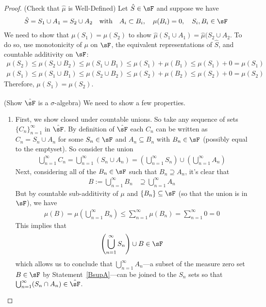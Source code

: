 \documentclass[12pt]{article}
\theoremstyle{plain}
\theoremstyle{definition}
\theoremstyle{remark}
\newcommand{\ninf}{_{n=1}^\infty}
\begin{document}
\begin{proof}
(Check that $\hat{\mu}$ is Well-Defined) Let $\hat{S}\in\sF$ and
suppose we have
\begin{align*}
    \hat{S} = S_1 \cup A_1 = S_2 \cup A_2
    \quad\text{with}\quad
    A_i \subset B_i, \quad \mu(B_i) = 0,
    \quad S_i, B_i \in \sF
\end{align*}
We need to show that $\mu(S_1) = \mu(S_2)$ to show $\hat{\mu}(S_1\cup
A_1) = \hat{\mu}(S_2\cup A_2$. To do so, use monotonicity of $\mu$ on
$\sF$, the equivalent representations of $\hat{S}$, and
countable additivity on $\sF$:
\begin{align*}
  \mu(S_2) \leq \mu(S_2 \cup B_2) \leq
      \mu(S_1 \cup B_1) \leq \mu(S_1) + \mu(B_1)
      \leq \mu(S_1) + 0 = \mu(S_1)  \\
  \mu(S_1) \leq \mu(S_1 \cup B_1) \leq
      \mu(S_2 \cup B_2) \leq \mu(S_2) + \mu(B_2)
      \leq \mu(S_2) + 0 = \mu(S_2)
\end{align*}
Therefore, $\mu(S_1) = \mu(S_2)$.
\\
\\
(Show $\hat{\sF}$ is a $\sigma$-algebra) We need to show a few properties.
\begin{enumerate}
  \item
    First, we show closed under countable unions. So take any sequence
    of sets $\{C_n\}\ninf$ in $\hat{\sF}$. By definition of
    $\hat{\sF}$ each $C_n$ can be written as $C_n=S_n\cup A_n$ for some
    $S_n \in \sF$ and $A_n\subseteq B_n$ with $B_n\in\sF$ (possibly
    equal to the emptyset). So consider the union
    \begin{align*}
        \bigcup^\infty_{n=1} C_n=
        \bigcup^\infty_{n=1} (S_n\cup A_n) =
        \left(\bigcup^\infty_{n=1} S_n\right)
        \cup \left(\bigcup^\infty_{n=1} A_n\right)
    \end{align*}
    Next, considering all of the $B_n\in\sF$ such that $B_n\supseteq
    A_n$, it's clear that
    \begin{align}
        B:=\bigcup^\infty_{n=1} B_n &\supseteq
        \bigcup^\infty_{n=1} A_n
        \label{BsupA}
    \end{align}
    But by countable sub-additivity of $\mu$ and $\{B_n\}\subseteq\sF$
    (so that the union is in $\sF$), we have
    \begin{align}
        \mu(B)
        =\mu\left(\bigcup^\infty_{n=1} B_n \right)
        \leq\sum^\infty_{n=1} \mu\left(B_n \right)
        =\sum^\infty_{n=1} 0 =0
    \end{align}
    This implies that
    \begin{align*}
        \left(\bigcup^\infty_{n=1} S_n\right) \cup B \in
        {\sF}
    \end{align*}
    which allows us to conclude that $\bigcup\ninf A_n$---a subset of
    the measure zero set $B\in\sF$ by Statement~\ref{BsupA}---can be
    joined to the $S_n$ sets so that
    $\bigcup\ninf (S_n \cap A_n)\in\hat{\sF}$.


\end{enumerate}
\end{proof}
\end{document}
